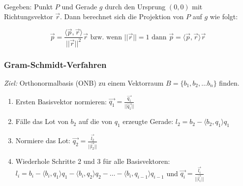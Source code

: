 Gegeben: Punkt \(P\) und Gerade \(g\) durch den Ursprung \((0,0)\) mit Richtungsvektor \(\vec{r}\). Dann berechnet sich die Projektion von \(P\) auf \(g\) wie folgt:

\begin{equation*}
    \vec{p} = \frac{\langle \vec{p}, \vec{r} \rangle}{||\vec{r}||^2} \vec{r} \text{  bzw. wenn } ||\vec{r}||=1 \text{ dann } \vec{p} = \langle \vec{p}, \vec{r} \rangle \vec{r}
\end{equation*}

\subsubsection{Gram-Schmidt-Verfahren}
\textit{Ziel:} Orthonormalbasis (ONB) zu einem Vektorraum \(B=\{b_1, b_2, \hdots b_n\}\) finden.

\begin{enumerate}
    \item Ersten Basisvektor normieren: \(\vec{q_1} = \frac{\vec{q_1}}{||\vec{q_1}||}\)
    \item Fälle das Lot von \(b_2\) auf die von \(q_1\) erzeugte Gerade: \(l_2 = b_2 - \langle b_2, q_1 \rangle q_1\)
    \item Normiere das Lot: \(\vec{q_2} = \frac{\vec{l_2}}{||\vec{l_2}||}\)
    \item Wiederhole Schritte 2 und 3 für alle Basisvektoren:\\ 
            \(l_i = b_i - \langle b_i, q_1 \rangle q_1 - \langle b_i, q_2 \rangle q_2 - \hdots - \langle b_i, q_{i-1} \rangle q_{i-1}\) und \(\vec{q_i} = \frac{\vec{l_i}}{||\vec{l_i}||}\)
\end{enumerate}